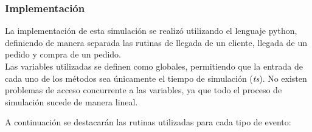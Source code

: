 \documentclass[a4paper,12pt]{article}
\begin{document}
	\subsubsection{Implementación}
	La implementación de esta simulación se realizó utilizando el lenguaje python, definiendo de manera separada las rutinas de llegada de un cliente, llegada de un pedido y compra de un pedido.\\
	
	Las variables utilizadas se definen como globales, permitiendo que la entrada de cada uno de los métodos sea únicamente el tiempo de simulación (\textit{ts}). No existen problemas de acceso concurrente a las variables, ya que todo el proceso de simulación sucede de manera lineal.
	
	A continuación se destacarán las rutinas utilizadas para cada tipo de evento:
\end{document}
